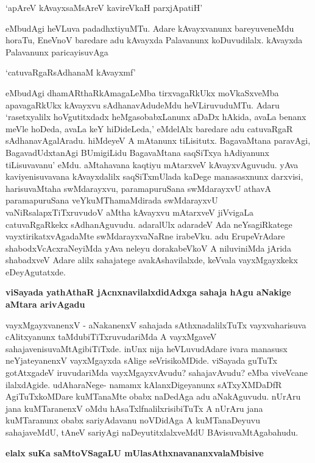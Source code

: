 \begin{artha}
`apAreV kAvayxsaMsAreV kavireVkaH parxjApatiH'\label{page193b} 
\end{artha}

eMbudAgi heVLuva padadhxtiyuMTu. Adare kAvayxvanunx bareyuveneMdu horaTu, EneVnoV baredare adu kAvayxda Palavanunx koDuvudilalx. kAvayxda Palavanunx paricayisuvAga 

\begin{artha}
`catuvaRgaRsAdhanaM kAvayxmf'\label{193} 
\end{artha}

eMbudAgi dhamARthaRkAmagaLeMba tirxvagaRkUkx moVkaSxveMba apavagaRkUkx kAvayxvu sAdhanavAdudeMdu heVLiruvuduMTu. Adaru `rasetxyalilx hoVgutitxdadx heMgasobabxLanunx aDaDx hAkida, avaLa benanx meVle hoDeda, avaLa keY hiDideLeda,' eMdelAlx baredare adu catuvaRgaR sAdhanavAgalAradu. hiMdeyeV A mAtanunx tiLisitutx. BagavaMtana paravAgi, BagavadUdxtanAgi BUmigiLidu BagavaMtana saqSiTxya hAdiyanunx tiLisuvavanu' eMdu. aMtahavana kaqtiyu mAtarxveV kAvayxvAguvudu. yAva kaviyenisuvavana kAvayxdalilx saqSiTxmUlada kaDege manasasxnunx darxvisi, harisuvaMtaha swMdarayxvu, paramapuruSana swMdarayxvU athavA paramapuruSana veYkuMThamaMdirada swMdarayxvU vaNiRsalapxTiTxruvudoV aMtha kAvayxvu mAtarxveV jiVvigaLa catuvaRgaRkekx sAdhanAguvudu. adaralUlx adaradeV Ada neYsagiRkatege vayxtirikatxvAgadaMte swMdarayxvaNaRne irabeVku. adu ErupeVrAdare shabodxVcAcxraNeyiMda yAva neleyu dorakabeVkoV A niluviniMda jArida shabadxveV Adare alilx sahajatege avakAshavilalxde, keVvala vayxMgayxkekx eDeyAgutatxde.

{\bigskip
\noindent
{\large\bf viSayada yathAthaR jAcnxnavilalxdidAdxga sahaja hAgu aNakige aMtara arivAgadu}}\label{page194}
\medskip

\noindent
vayxMgayxvanenxV - aNakanenxV sahajada sAthxnadalilxTuTx vayxvaharisuva cAlitxyanunx taMdubiTiTxruvudariMda A vayxMgaveV sahajavenisuvaMtAgibiTiTxde. inUnx nija heVLuvudAdare ivara manasusx neYjateyanenxV vayxMgayxda sAlige seVrisikoMDide. viSayada guTuTx gotAtxgadeV iruvudariMda vayxMgayxvAvudu? sahajavAvudu? eMba viveVcane ilalxdAgide. udAharaNege- namamx kAlanxDigeyanunx sATxyXMDaDfR AgiTuTxkoMDare kuMTanaMte obabx naDedAga adu aNakAguvudu. nUrAru jana kuMTaranenxV oMdu hAsaTxlfnalilxrisibiTuTx A nUrAru jana kuMTaranunx obabx sariyAdavanu noVDidAga A kuMTanaDeyuvu sahajaveMdU, tAneV sariyAgi naDeyutitxlalxveMdU BAvisuvaMtAgabahudu.

{\bigskip
\noindent
{\large\bf elalx suKa saMtoVSagaLU mUlasAthxnavananxvalaMbisive}}\label{page194a}
\smallskip

